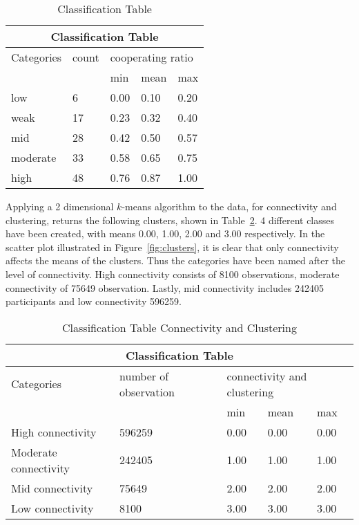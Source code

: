 \begin{table}[H]
	\centering
	\begin{adjustbox}{width=0.4\textwidth}
		\small
		\begin{tabular}{|l|l|l|l|l|}
			\hline
			\multicolumn{5}{|c|}{Classification Table}                        \\ \hline
			Categories & count & \multicolumn{3}{l|}{cooperating ratio}        \\ \hline
			         &    & min  & mean & max  \\ \hline
			low      & 6  & 0.00 & 0.10 & 0.20 \\ \hline
			weak     & 17 & 0.23 & 0.32 & 0.40 \\ \hline
			mid      & 28 & 0.42 & 0.50 & 0.57 \\ \hline
			moderate & 33 & 0.58 & 0.65 & 0.75 \\ \hline
			high     & 48 & 0.76 & 0.87 & 1.00 \\ \hline
		\end{tabular}
	\end{adjustbox}
	\caption{Classification Table}
	\label{table:class}
\end{table}

Applying a 2 dimensional \(k\)-means algorithm to the data, for connectivity and
clustering, returns the following clusters, shown in Table~\ref{table:clusters}.
4 different classes have been created, with means 0.00, 1.00, 2.00 and 3.00 respectively.
In the scatter plot illustrated in Figure~\ref{fig:clusters}, it is clear that only connectivity
affects the means of the clusters. Thus the categories have been named after
the level of connectivity. High connectivity consists of 8100 observations,
moderate connectivity of 75649 observation. Lastly, mid connectivity includes
242405 participants and low connectivity 596259.

\begin{table}[!hbtp]
	\centering
	\begin{adjustbox}{width=0.7\textwidth}
		\small
		\begin{tabular}{|l|l|l|l|l|}
			\hline
			\multicolumn{5}{|c|}{Classification Table} \\ \hline
			Categories & number of observation & \multicolumn{3}{l|}{connectivity and clustering} \\ \hline
			                      &        & min  & mean & max  \\ \hline
			High connectivity     & 596259 & 0.00 & 0.00 & 0.00 \\ \hline
			Moderate connectivity & 242405 & 1.00 & 1.00 & 1.00 \\ \hline
			Mid connectivity      & 75649  & 2.00 & 2.00 & 2.00 \\ \hline
			Low connectivity      & 8100   & 3.00 & 3.00 & 3.00 \\ \hline
		\end{tabular}
	\end{adjustbox}
	\caption{Classification Table Connectivity and Clustering}
	\label{table:clusters}
\end{table}

